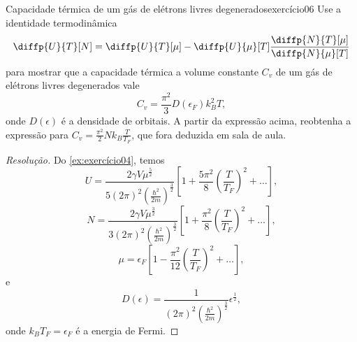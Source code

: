 \begin{exercício}{Capacidade térmica de um gás de elétrons livres degenerados}{exercício06}
    Use a identidade termodinâmica
    \begin{equation*}
        \diffp{U}{T}[N] = \diffp{U}{T}[\mu] - \diffp{U}{\mu}[T] \frac{\diffp{N}{T}[\mu]}{\diffp{N}{\mu}[T]}
    \end{equation*}
    para mostrar que a capacidade térmica a volume constante \(C_v\) de um gás de elétrons livres degenerados vale
    \begin{equation*}
        C_v = \frac{\pi^2}{3} D(\epsilon_F) k_B^2T,
    \end{equation*}
    onde \(D(\epsilon)\) é a densidade de orbitais. A partir da expressão acima, reobtenha a expressão para \(C_v = \frac{\pi^2}{2} N k_B \frac{T}{T_F}\), que fora deduzida em sala de aula.
\end{exercício}
\begin{proof}[Resolução]
    Do \cref{ex:exercício04}, temos
    \begin{equation*}
        U = \frac{2 \gamma V \mu^{\frac{5}{2}}}{5(2\pi)^2 \left(\frac{\hbar^2}{2m}\right)^{\frac{3}{2}}} \left[1 + \frac{5\pi^2}{8}\left(\frac{T}{T_F}\right)^2 + \dots\right],
    \end{equation*}
    \begin{equation*}
        N = \frac{2\gamma V \mu^{\frac{3}{2}}}{3(2\pi)^2 \left(\frac{\hbar^2}{2m}\right)^{\frac{3}{2}}}\left[1 + \frac{\pi^2}{8}\left(\frac{T}{T_F}\right)^2 + \dots\right],
    \end{equation*}
    \begin{equation*}
        \mu = \epsilon_F \left[1 - \frac{\pi^2}{12}\left(\frac{T}{T_F}\right)^2 + \dots\right],
    \end{equation*}
    e
    \begin{equation*}
        D(\epsilon) = \frac{1}{(2\pi)^2 \left(\frac{\hbar^2}{2m}\right)^{\frac{3}{2}}} \epsilon^{\frac12},
    \end{equation*}
    onde \(k_B T_F = \epsilon_F\) é a energia de Fermi.
\end{proof}
